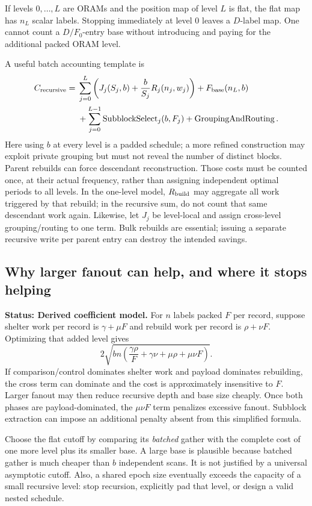 \documentclass[11pt]{article}
\newcommand{\status}[1]{\textbf{Status: #1.}}
\begin{document}
If levels $0,\ldots,L$ are ORAMs and the position map of level $L$ is flat, the
flat map has $n_L$ scalar labels. Stopping immediately at level 0 leaves a
$D$-label map. One cannot count a $D/F_0$-entry base without introducing and
paying for the additional packed ORAM level.

A useful batch accounting template is
\begin{align}
C_{\rm recursive}={}&\sum_{j=0}^{L}
\left(J_j(S_j,b)+\frac{b}{S_j}R_j(n_j,w_j)\right)
+F_{\rm base}(n_L,b)\nonumber\\
&+\sum_{j=0}^{L-1}\operatorname{SubblockSelect}_j(b,F_j)
+\operatorname{GroupingAndRouting}.
\label{eq:recursive}
\end{align}
Here using $b$ at every level is a padded schedule; a more refined construction
may exploit private grouping but must not reveal the number of distinct blocks.
Parent rebuilds can force descendant reconstruction. Those costs must be counted
once, at their actual frequency, rather than assigning independent optimal
periods to all levels. In the one-level model, $R_{\rm build}$ may aggregate all
work triggered by that rebuild; in the recursive sum, do not count that same
descendant work again. Likewise, let $J_j$ be level-local and assign cross-level
grouping/routing to one term. Bulk rebuilds are essential; issuing a separate recursive
write per parent entry can destroy the intended savings.

\subsection{Why larger fanout can help, and where it stops helping}

\status{Derived coefficient model}
For $n$ labels packed $F$ per record, suppose shelter work per record is
$\gamma+\mu F$ and rebuild work per record is $\rho+\nu F$.
Optimizing that added level gives
\begin{equation}
2\sqrt{bn\left(\frac{\gamma\rho}{F}
+\gamma\nu+\mu\rho+\mu\nu F\right)}.
\label{eq:fanout}
\end{equation}
If comparison/control dominates shelter work and payload dominates rebuilding,
the cross term can dominate and the cost is approximately insensitive to $F$.
Larger fanout may then reduce recursive depth and base size cheaply. Once both
phases are payload-dominated, the $\mu\nu F$ term penalizes excessive fanout.
Subblock extraction can impose an additional penalty absent from this simplified
formula.

Choose the flat cutoff by comparing its \emph{batched} gather with the complete
cost of one more level plus its smaller base. A large base is plausible because
batched gather is much cheaper than $b$ independent scans. It is not justified
by a universal asymptotic cutoff. Also, a shared epoch size eventually exceeds
the capacity of a small recursive level: stop recursion, explicitly pad that
level, or design a valid nested schedule.
\end{document}
